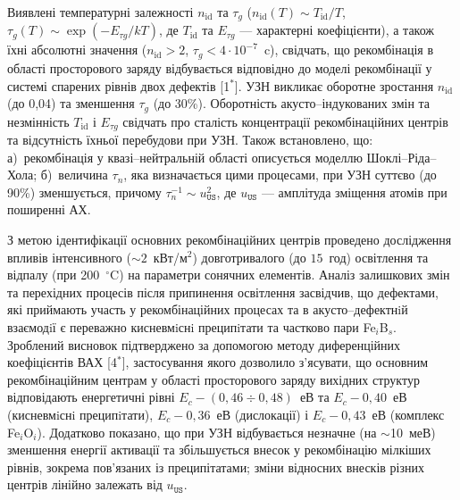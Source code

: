 Виявлені температурні залежності $n_\mathrm{id}$ та $\tau_g$
($n_{\mathrm{id}}(T) \sim T_{\mathrm{id}}/T$,
$\tau_{g}(T)\sim\exp\left(-E_{\tau g}/kT\right)$,
де $T_{\mathrm{id}}$ та $E_{\tau g}$ --- характерні коефіцієнти),
а також їхні абсолютні значення ($n_{\mathrm{id}}>2$, $\tau_{g}<4\cdot10^{-7}$~c),
свідчать, що рекомбінація в області просторового заряду відбувається відповідно до
моделі рекомбінації у системі спарених рівнів двох дефектів
[1$^*$].
УЗН викликає оборотне зростання $n_\mathrm{id}$  (до 0,04) та зменшення $\tau_g$ (до 30\%).
Оборотність акусто--індукованих змін та незмінність $T_{\mathrm{id}}$ і $E_{\tau g}$
свідчать про
сталість концентрації рекомбінаційних центрів та відсутність їхньої перебудови
при УЗН.
Також встановлено, що:
а)~рекомбінація у квазі--нейтральній області описується моделлю Шоклі--Ріда--Хола;
б)~величина $\tau_n$, яка визначається цими процесами,
при УЗН суттєво (до 90\%) зменшується,
причому
$\tau_{n}^{-1}\sim u_\mathtt{US}^2$,
де $u_\mathtt{US}$ --- амплітуда зміщення атомів при поширенні АХ.

З метою ідентифікації основних рекомбінаційних центрів
 проведено дослідження впливів інтенсивного ($\sim\!2$~кВт/м$^2$) довготривалого (до  $15$~год) освітлення
та відпалу (при 200~$^\circ$C) на параметри сонячних елементів.
Аналіз залишкових змін та перехідних процесів після припинення освітлення засвідчив, що дефектами, які приймають участь у рекомбінаційних процесах та в акусто--дефектнiй взаємодiї є переважно кисневмiснi преципiтати та
частково пари Fe$_i$B$_s$.
Зроблений висновок підтверджено за допомогою методу диференційних коефіцієнтів ВАХ
[4$^*$],
застосування якого дозволило з'ясувати, що основним рекомбінаційним центрам у області просторового заряду вихідних структур відповідають енергетичні рівні
$E_c-(0,46\div0,48)$~еВ та $E_c-0,40$~еВ (кисневмiснi преципiтати),
$E_c-0,36$~еВ (дислокації) і
$E_c-0,43$~еВ (комплекс Fe$_i$O$_i$).
Додатково показано, що
при УЗН відбувається незначне (на $\sim$10~меВ) зменшення енергії активації та
збільшується внесок у рекомбінацію мілкіших рівнів, зокрема пов'язаних із преципітатами;
зміни відносних внесків різних центрів лінійно залежать від $u_\mathtt{US}$.

